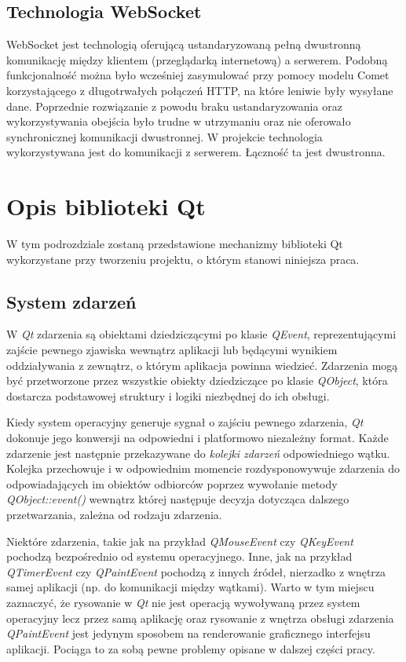 \documentclass[polish]{inz}
\begin{document}
\subsection{Technologia WebSocket}
WebSocket jest technologią oferującą ustandaryzowaną pełną dwustronną komunikację między klientem (przeglądarką internetową) a serwerem. Podobną funkcjonalność można było wcześniej zasymulować przy pomocy modelu Comet korzystającego z długotrwałych połączeń HTTP, na które leniwie były wysyłane dane. Poprzednie rozwiązanie z powodu braku ustandaryzowania oraz wykorzystywania obejścia było trudne w utrzymaniu oraz nie oferowało synchronicznej komunikacji dwustronnej.
W projekcie technologia wykorzystywana jest do komunikacji z serwerem. Łączność ta jest dwustronna.

\section{Opis biblioteki Qt}
W tym podrozdziale zostaną przedstawione mechanizmy biblioteki Qt wykorzystane przy tworzeniu projektu, o którym stanowi niniejsza praca. 

\subsection{System zdarzeń}
W \emph{Qt} zdarzenia są obiektami dziedziczącymi po klasie \emph{QEvent}, reprezentującymi zajście pewnego zjawiska wewnątrz aplikacji lub będącymi wynikiem oddziaływania z zewnątrz, o którym aplikacja powinna wiedzieć. Zdarzenia mogą być przetworzone przez wszystkie obiekty dziedziczące po klasie \emph{QObject}, która dostarcza podstawowej struktury i logiki niezbędnej do ich obsługi. 

Kiedy system operacyjny generuje sygnał o zajściu pewnego zdarzenia, \emph{Qt} dokonuje jego konwersji na odpowiedni i platformowo niezależny format. Każde zdarzenie jest następnie przekazywane do \emph{kolejki zdarzeń} odpowiedniego wątku. Kolejka przechowuje i w odpowiednim momencie rozdysponowywuje zdarzenia do odpowiadających im obiektów odbiorców poprzez wywołanie metody \emph{QObject::event()} wewnątrz której następuje decyzja dotycząca dalszego przetwarzania, zależna od rodzaju zdarzenia. 

Niektóre zdarzenia, takie jak na przykład \emph{QMouseEvent} czy \emph{QKeyEvent} pochodzą bezpośrednio od systemu operacyjnego. Inne, jak na przykład \emph{QTimerEvent} czy \emph{QPaintEvent} pochodzą z innych źródeł, nierzadko z wnętrza samej aplikacji (np. do komunikacji między wątkami). Warto w tym miejscu zaznaczyć, że rysowanie w \emph{Qt} nie jest operacją wywoływaną przez system operacyjny lecz przez samą aplikację oraz rysowanie z wnętrza obsługi zdarzenia \emph{QPaintEvent} jest jedynym sposobem na renderowanie graficznego interfejsu aplikacji. Pociąga to za sobą pewne problemy opisane w dalszej części pracy.
\end{document}
